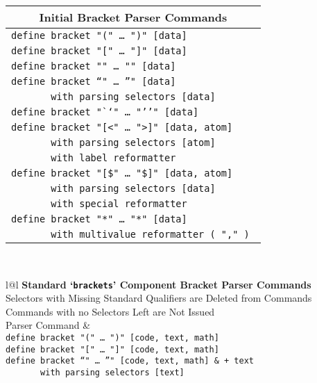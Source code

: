 \documentclass[12pt]{article}
\makeatletter
\newcommand{\TT}[1]{{\tt \bfseries #1}}
\newcommand{\ttkey}[1]{\TT{#1}\index{#1@\TT{#1}}}
\makeatother
\begin{document}
\begin{center}\label{UNTYPED-BRACKET-BUILTINS}
\begin{tabular}{l}
\multicolumn{1}{c}{\bf Initial Bracket Parser Commands}
\\\hline
\tt define bracket "(" \ldots~")" [data] \\
\tt define bracket "[" \ldots~"]" [data] \\
\tt define bracket "{{" \ldots~"}}" [data] \\
\tt define bracket "`" \ldots~"'" [data] \\
\tt ~~~~~~~with parsing selectors [data] \\
\tt define bracket "``" \ldots~"''" [data] \\
\tt define bracket "[<" \ldots~">]" [data, atom] \\
\tt ~~~~~~~with parsing selectors [atom] \\
\tt ~~~~~~~with label reformatter \\
\tt define bracket "[\$" \ldots~"\$]" [data, atom] \\
\tt ~~~~~~~with parsing selectors [data] \\
\tt ~~~~~~~with special reformatter \\
\tt define bracket "{*" \ldots~"*}" [data] \\
\tt ~~~~~~~with multivalue reformatter ( "," ) \\
\end{tabular}
\\[2ex]
\begin{tabular}{l@{\hspace*{0.2in}}l}
{\bf Standard `\ttkey{brackets}'\label{STANDARD-BRACKETS-1} Component
     Bracket Parser Commands}
\\[1ex]
{Selectors with Missing Standard Qualifiers are Deleted from Commands} \\
{Commands with no Selectors Left are Not Issued}
\\[1ex]
Parser Command				& 
\\\hline
\tt define bracket "(" \ldots~")" [code, text, math] \\
\tt define bracket "[" \ldots~"]" [code, text, math] \\
\tt define bracket "`" \ldots~"'" [code, text, math]	     & \tt + text \\
\tt ~~~~~~~with parsing selectors [text] \\

\end{tabular}
\end{center}
\end{document}
